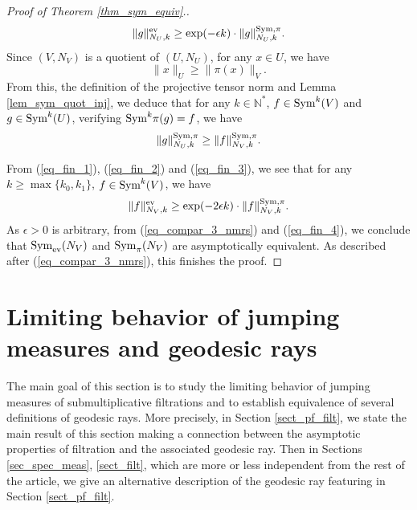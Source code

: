 \documentclass[12pt]{article}
\numberwithin{equation}{section}
\theoremstyle{theorem}
\theoremstyle{definition}
\theoremstyle{remark}
\newcommand{\sym}{{\rm{Sym}}}
\newcommand{\nat}{\mathbb{N}}
\begin{document}
\begin{proof}[Proof of Theorem \ref{thm_sym_equiv}.]
		\begin{equation}\label{eq_fin_2}
			\| g \|^{{\rm{ev}}}_{N_U, k}
			\geq
			\exp(- \epsilon k)
			\cdot
			\| g \|^{\sym, \pi}_{N_U, k}.
		\end{equation}
		Since $(V, N_V)$ is a quotient of $(U, N_U)$, for any $x \in U$, we have 
		\begin{equation}
			\| x \|_U \geq \| \pi(x) \|_V.
		\end{equation} 
		From this, the definition of the projective tensor norm and Lemma \ref{lem_sym_quot_inj}, we deduce that for any $k \in \nat^*$, $f \in \sym^k(V)$ and $g \in \sym^k(U)$, verifying $\sym^k \pi(g) = f$, we have
		\begin{equation}\label{eq_fin_3}
			\| g \|^{\sym, \pi}_{N_U, k}
			\geq
			\| f \|^{\sym, \pi}_{N_V, k}.
		\end{equation}
		\par 
		From (\ref{eq_fin_1}), (\ref{eq_fin_2}) and (\ref{eq_fin_3}), we see that for any $k \geq \max \{ k_0, k_1 \}$, $f \in \sym^k(V)$, we have
		\begin{equation}\label{eq_fin_4}
			\| f \|^{{\rm{ev}}}_{N_V, k}
			\geq
			\exp(- 2 \epsilon k)
			\cdot
			\| f \|^{\sym, \pi}_{N_V, k}.
		\end{equation}
		As $\epsilon > 0$ is arbitrary, from (\ref{eq_compar_3_nmrs}) and (\ref{eq_fin_4}), we conclude that $\sym_{{\rm{ev}}}(N_V)$ and $\sym_{\pi}(N_V)$ are asymptotically equivalent.
		As described after (\ref{eq_compar_3_nmrs}), this finishes the proof.
	\end{proof}
	
\section{Limiting behavior of jumping measures and geodesic rays}\label{sect_gr_jm}
	The main goal of this section is to study the limiting behavior of jumping measures of submultiplicative filtrations and to establish equivalence of several definitions of geodesic rays.
	More precisely, in Section \ref{sect_pf_filt}, we state the main result of this section making a connection between the asymptotic properties of filtration and the associated geodesic ray. 
	Then in Sections \ref{sec_spec_meas}, \ref{sect_filt}, which are more or less independent from the rest of the article, we give an alternative description of the geodesic ray featuring in Section \ref{sect_pf_filt}.
	
 
\end{document}

